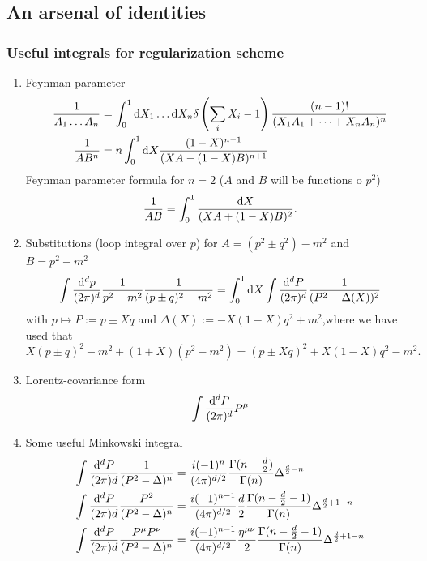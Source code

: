 \subsection{An arsenal of identities}
\subsubsection{Useful integrals for regularization scheme}
\begin{enumerate}
	\item Feynman parameter
	\begin{align}
		\frac{1}{A_1 \dots A_n} &= \int_0^1 \mathrm{d} X_1 \dots \mathrm{d} X_n \delta \left(\sum_i X_i -1\right) \frac{(n-1)!}{(X_1 A_1+\dots+X_nA_n)^n}\\
		\frac{1}{AB^n} &=n \int_0^1 \mathrm{d} X \frac{(1-X)^{n-1}}{(XA-(1-X)B)^{n+1}}
	\end{align}
	Feynman parameter formula for $n=2$ ($A$ and $B$ will be functions o $p^2$)
	\begin{equation}
	\frac{1}{AB} = \int_0^1 \frac{\mathrm{d} X}{(XA+(1-X) B)^2}.
	\end{equation}
	\item Substitutions (loop integral over $p$) for $A=(p^2 \pm q^2)-m^2$ and $B=p^2-m^2$
	\begin{equation}
	\int \frac{\mathrm{d}^d p}{(2 \pi)^d} \frac{1}{p^2-m^2} \frac{1}{(p\pm q)^2-m^2} = \int_0^1 \mathrm{d} X \int \frac{\mathrm{d}^d P}{(2 \pi)^d} \frac{1}{(P^2-\Delta(X))^2}
	\end{equation}
	with $p\mapsto P:= p\pm Xq$ and $\Delta(X) := -X(1-X)q^2+m^2$,where we have used that 
	\begin{equation}
	X(p \pm q)^2 -m^2 +(1+X) (p^2-m^2) = (p\pm Xq)^2+X(1-X) q^2-m^2.
	\end{equation}
	\item Lorentz-covariance form
	\begin{equation}
	\int \frac{\mathrm{d}^d P}{(2 \pi)^d} P^\mu
	\end{equation}
	\item Some useful Minkowski integral
	\begin{align}
		\int \frac{\md^dP}{(2\pi) d} \frac{1}{(P^2-\Delta)^n} &= \frac{i (-1)^n}{(4\pi)^{d/2}} \frac{\Gamma(n-\frac{d}{2} )}{\Gamma(n)} \Delta^{\frac{d}{2} -n}\\
		\int \frac{\md^dP}{(2\pi) d} \frac{P^2}{(P^2-\Delta)^n} &= \frac{i (-1)^{n-1}}{(4 \pi)^{d/2}} \frac{d}{2} \frac{\Gamma(n-\frac{d}{2} -1)}{\Gamma(n)} \Delta^{\frac{d}{2} +1-n} \\
		\int \frac{\md^dP}{(2\pi) d} \frac{P^\mu P^\nu}{(P^2-\Delta)^n} &= \frac{i(-1)^{n-1}}{(4 \pi)^{d/2}} \frac{\eta^{\mu \nu}}{2} \frac{\Gamma(n-\frac{d}{2}-1)}{\Gamma(n)} \Delta^{\frac{d}{2} +1 -n}\\

\end{align}
\end{enumerate}
